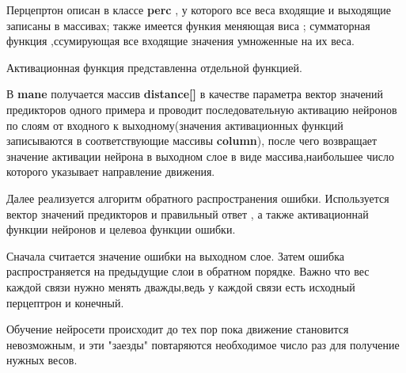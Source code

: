 	Перцепртон описан в классе \textbf{perc} , у которого все веса входящие и выходящие записаны в массивах; также имеется функия меняющая виса ; сумматорная функция ,ссумирующая все входящие значения умноженные на их веса.
	
	Активационная функция представленна отдельной функцией.

    В \textbf{mane} получается массив \textbf{distance[]} в качестве параметра вектор значений предикторов одного примера и проводит последовательную
	активацию нейронов по слоям от входного к выходному(значения активационных функций записываются в соответствующие массивы \textbf{column}), после чего возвращает значение активации нейрона в выходном слое в виде массива,наибольшее число которого указывает направление движения.

	Далее реализуется алгоритм обратного распространения ошибки.
	Используется вектор значений предикторов и правильный ответ , а также активационнай функции нейронов и целевоа функции ошибки.

	Сначала считается значение ошибки на выходном слое.	Затем ошибка распространяется на предыдущие слои в обратном порядке.
	Важно что вес каждой связи нужно менять дважды,ведь у каждой связи есть исходный перцептрон и конечный.

	Обучение нейросети происходит до тех пор пока движение становится невозможным, и эти "заезды" повтаряются необходимое число раз для получение нужных весов.

